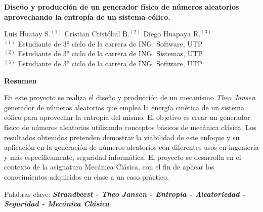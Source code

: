 \thispagestyle{fancy} %

\vspace*{-1.5cm} %

\begin{center}
  {\LARGE\bfseries
    Diseño y producción de un generador físico de números aleatorios aprovechando la entropía de un sistema eólico.\\
      }

      \vspace{0.5em}

      $\text{Luis Huatay S.}^{(1)}$ \hspace{2em} $\text{Cristian Cristóbal B.}^{(2)}$ \hspace{2em} $\text{Diego Huapaya R.}^{(3)}$ \\
      $^{(1)}$ Estudiante de 3° ciclo de la carrera de ING. Software, UTP \\
      $^{(2)}$ Estudiante de 3° ciclo de la carrera de ING. Sistemas, UTP \\
      $^{(3)}$ Estudiante de 3° ciclo de la carrera de ING. Software, UTP
\end{center}
\vspace{-1cm}
\vspace{1.5em}
\begin{center}
  {\large\bfseries Resumen}
\end{center}
\vspace{-0.7cm}

En este proyecto se realiza el diseño y producción de un mecanismo \textit{Theo Jansen} generador de números aleatorios que emplea la energía cinética de un sistema eólico para aprovechar la entropía del mismo. El objetivo es crear un generador físico de números aleatorios utilizando conceptos básicos de mecánica clásica. Los resultados obtenidos pretenden demostrar la viabilidad de este enfoque y su aplicación en la generación de números aleatorios con diferentes usos en ingeniería y más específicamente, seguridad informática. El proyecto se desarrolla en el contexto de la asignatura Mecánica Clásica, con el fin de aplicar los conocimientos adquiridos en clase a un caso práctico.

\begin{center}
  Palabras clave: {\textbf{\textit{Strandbeest - Theo Jansen - Entropía - Aleatoriedad - Seguridad - Mecánica Clásica}}}
\end{center}


